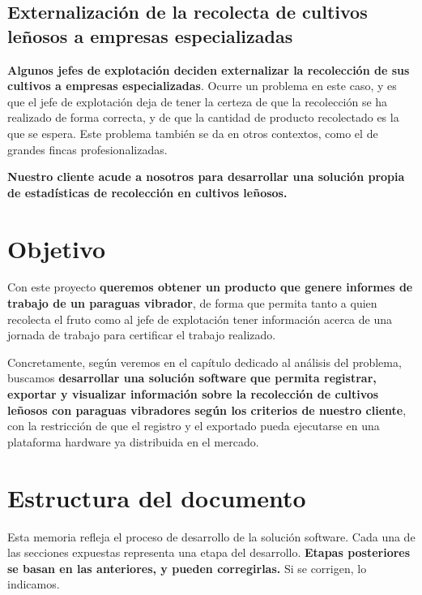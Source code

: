 \subsection{Externalización de la recolecta de cultivos leñosos a empresas especializadas}

\textbf{Algunos jefes de explotación deciden externalizar la recolección
de sus cultivos a empresas especializadas}. Ocurre un problema en este
caso, y es que el jefe de explotación deja de tener la certeza de que la
recolección se ha realizado de forma correcta, y de que la cantidad de producto
recolectado es la que se espera. Este problema también se da en otros contextos,
como el de grandes fincas profesionalizadas.

\textbf{Nuestro cliente acude a nosotros para desarrollar una solución propia de
estadísticas de recolección en cultivos leñosos.}

\section{Objetivo}

Con este proyecto \textbf{queremos obtener un producto que genere informes
de trabajo de un paraguas vibrador}, de forma que permita tanto a
quien recolecta el fruto como al jefe de explotación tener información
acerca de una jornada de trabajo para certificar el trabajo realizado.

Concretamente, según veremos en el capítulo dedicado al análisis del problema,
buscamos \textbf{desarrollar
una solución software que permita registrar, exportar y visualizar
información sobre la recolección de cultivos
leñosos con paraguas vibradores según los criterios de nuestro cliente},
con la restricción de que el registro y el exportado pueda ejecutarse en
una plataforma hardware ya distribuida en el mercado.

\section{Estructura del documento}

Esta memoria refleja el proceso de desarrollo de la solución software.
Cada una de las secciones expuestas representa una etapa del desarrollo.
\textbf{Etapas posteriores se basan en las anteriores, y pueden corregirlas.}
Si se corrigen, lo indicamos.

